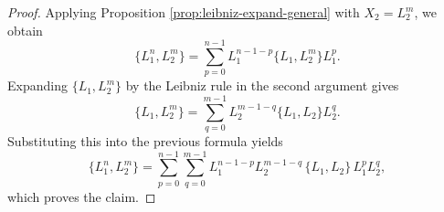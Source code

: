 \begin{proof}
    Applying Proposition \ref{prop:leibniz-expand-general} with $X_2 = L_2^m$, we obtain
    \begin{equation}
        \{L_1^n, L_2^m\}
        =
        \sum_{p=0}^{n-1}
        L_1^{n-1-p} \{L_1, L_2^m\} L_1^p.
    \end{equation}
    Expanding $\{L_1, L_2^m\}$ by the Leibniz rule in the second argument gives
    \begin{equation}
        \{L_1, L_2^m\}
        =
        \sum_{q=0}^{m-1}
        L_2^{m-1-q} \{L_1, L_2\} L_2^q.
    \end{equation}
    Substituting this into the previous formula yields
    \begin{equation}
        \{L_1^n, L_2^m\}
        =
        \sum_{p=0}^{n-1} \sum_{q=0}^{m-1}
        L_1^{n-1-p} L_2^{m-1-q}
        \, \{L_1, L_2\} \,
        L_1^p L_2^q,
    \end{equation}
    which proves the claim.
\end{proof}


